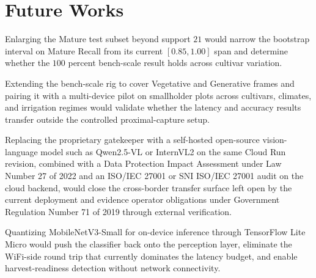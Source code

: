 \section{Future Works}

Enlarging the Mature test subset beyond support $21$ would narrow the bootstrap interval on Mature Recall from its current $[0.85, 1.00]$ span and determine whether the $100$ percent bench-scale result holds across cultivar variation.

Extending the bench-scale rig to cover Vegetative and Generative frames and pairing it with a multi-device pilot on smallholder plots across cultivars, climates, and irrigation regimes would validate whether the latency and accuracy results transfer outside the controlled proximal-capture setup.

Replacing the proprietary gatekeeper with a self-hosted open-source vision-language model such as Qwen2.5-VL or InternVL2 on the same Cloud Run revision, combined with a Data Protection Impact Assessment under Law Number 27 of 2022 and an ISO/IEC 27001 or SNI ISO/IEC 27001 audit on the cloud backend, would close the cross-border transfer surface left open by the current deployment and evidence operator obligations under Government Regulation Number 71 of 2019 through external verification.

Quantizing MobileNetV3-Small for on-device inference through TensorFlow Lite Micro would push the classifier back onto the perception layer, eliminate the WiFi-side round trip that currently dominates the latency budget, and enable harvest-readiness detection without network connectivity.
